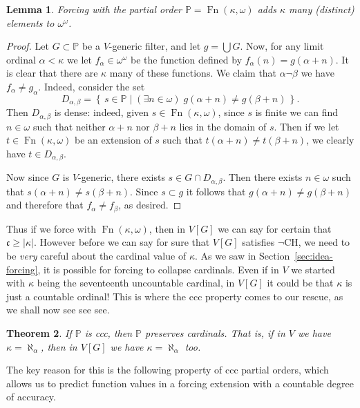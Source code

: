 \documentclass[11pt,oneside]{amsbook}
\newcommand{\set}[1]{\left\{\,#1\,\right\}}
\newcommand{\PP}{\mathbb P}
\DeclareMathOperator{\Fn}{Fn}
\theoremstyle{definition}
\theoremstyle{plain}
\newtheorem{thm}{Theorem}[section]
\newtheorem{lem}[thm]{Lemma}
\theoremstyle{definition}
\theoremstyle{remark}
\numberwithin{equation}{section}
\numberwithin{figure}{section}
\begin{document}
\begin{lem}
  Forcing with the partial order $\PP=\Fn(\kappa,\omega)$ adds $\kappa$ many (distinct) elements to $\omega^\omega$.
\end{lem}

\begin{proof}
  Let $G\subset\PP$ be a $V$-generic filter, and let $g=\bigcup G$. Now, for any limit ordinal $\alpha<\kappa$ we let $f_\alpha\in\omega^\omega$ be the function defined by $f_\alpha(n)=g(\alpha+n)$. It is clear that there are $\kappa$ many of these functions. We claim that $\alpha\neg\beta$ we have $f_\alpha\neq g_\alpha$. Indeed, consider the set
  \[D_{\alpha,\beta}=\set{s\in\PP\mid (\exists n\in\omega)\;g(\alpha+n)\neq g(\beta+n)}\text{.}
  \]
  Then $D_{\alpha,\beta}$ is dense: indeed, given $s\in\Fn(\kappa,\omega)$, since $s$ is finite we can find $n\in\omega$ such that neither $\alpha+n$ nor $\beta+n$ lies in the domain of $s$. Then if we let $t\in\Fn(\kappa,\omega)$ be an extension of $s$ such that $t(\alpha+n)\neq t(\beta+n)$, we clearly have $t\in D_{\alpha,\beta}$.

  Now since $G$ is $V$-generic, there exists $s\in G\cap D_{\alpha,\beta}$. Then there exists $n\in\omega$ such that $s(\alpha+n)\neq s(\beta+n)$. Since $s\subset g$ it follows that $g(\alpha+n)\neq g(\beta+n)$ and therefore that $f_\alpha\neq f_\beta$, as desired.
\end{proof}

Thus if we force with $\Fn(\kappa,\omega)$, then in $V[G]$ we can say for certain that $\mathfrak c\geq|\kappa|$. However before we can say for sure that $V[G]$ satisfies $\neg$CH, we need to be \emph{very} careful about the cardinal value of $\kappa$. As we saw in Section~\ref{sec:idea-forcing}, it is possible for forcing to collapse cardinals. Even if in $V$ we started with $\kappa$ being the seventeenth uncountable cardinal, in $V[G]$ it could be that $\kappa$ is just a countable ordinal! This is where the ccc property comes to our rescue, as we shall now see see see.

\begin{thm}
  \label{thm:ccc-preserve}
  If $\PP$ is ccc, then $\PP$ preserves cardinals. That is, if in $V$ we have $\kappa=\aleph_\alpha$, then in $V[G]$ we have $\kappa=\aleph_\alpha$ too.
\end{thm}

The key reason for this is the following property of ccc partial orders, which allows us to predict function values in a forcing extension with a countable degree of accuracy.
\end{document}
